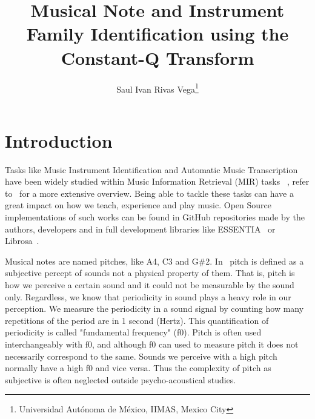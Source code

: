 \documentclass{article}
\title{Musical Note and Instrument Family Identification using the Constant-Q Transform}
\author{%
Saul Ivan Rivas Vega\thanks{Universidad Autónoma de México, IIMAS, Mexico City}%
}
\date{}
\begin{document}

\saythanks{}


\section{Introduction}\label{sec:introduction}
Tasks like Music Instrument Identification and Automatic Music Transcription have been widely studied within Music Information Retrieval (MIR) tasks ~\citep{Kitahara2005InstrumentII,Salamon2012MelodyEF,Gururani2019AnAM}, refer to~\citep{benetos_automatic_2013,benetos_automatic_2019} for a more extensive overview.  Being able to tackle these tasks can have a great impact on how we teach, experience and play music. Open Source implementations of such works can be found in GitHub repositories made by the authors, developers and in full development libraries like ESSENTIA~\cite{bogdanov_essentia_2013} or Librosa~\cite{brian_mcfee-proc-scipy-2015}. 

Musical notes are named pitches, like A4, C3 and G\#2. In~\cite{schnupp_auditory_2011} pitch is defined as a subjective percept of sounds not a physical property of them. That is, pitch is how we perceive a certain sound and it could not be measurable by the sound only. Regardless, we know that periodicity in sound plays a heavy role in our perception. We measure the periodicity in a sound signal by counting how many repetitions of the period are in 1 second (Hertz). This quantification of periodicity is called "fundamental frequency" (f0). Pitch is often used interchangeably with f0, and although f0 can used to measure pitch it does not necessarily correspond to the same. Sounds we perceive with a high pitch normally have a high f0 and vice versa. Thus the complexity of pitch as subjective is often neglected outside psycho-acoustical studies.
\end{document}
